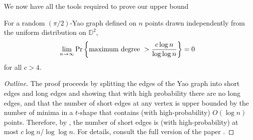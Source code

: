 \documentclass[10pt]{llncs}
\newcommand{\D}{\mathbb{D}}
\newcommand{\PROB}{\Pr}
\newcommand{\EXP}{\mathrm{E}}
\begin{document}
We now have all the tools required to prove our upper bound

\begin{thm}
For a random $(\pi/2)$-Yao graph defined on $n$ points drawn
independently from the uniform distribution on
$\D^2$, 
\[
\lim_{n\to\infty} \PROB \left\{ \hbox{\rm maximum degree}~> {c \log n \over
\log \log n} \right\} = 0
\]
for all $c > 4$.
\end{thm}

\begin{proof}[Outline]
The proof proceeds by splitting the edges of the Yao graph into short edges
and long edges and showing that with high probability there are no
long edges, and that the number of short edges at any vertex is
upper bounded by the number of minima in a $t$-shape that contains (with
high-probability) $O(\log n)$ points.  Therefore,  by
, the number of short edges is (with
high-probability) at most $c\log n/\log\log n$.  For details, consult the
full version of the paper \cite{dgm09}.
%
%
%

\end{proof}
\end{document}
